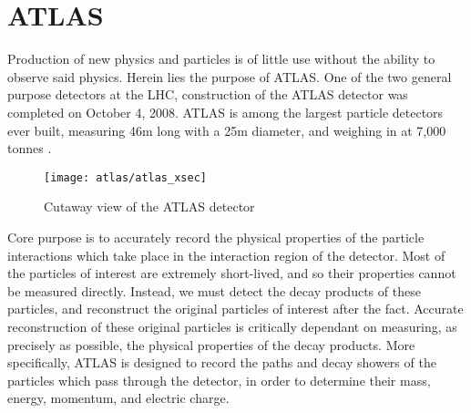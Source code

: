 



\chapter{ATLAS} 
    Production of new physics and particles is of little use without the ability to observe said physics.
    Herein lies the purpose of ATLAS.
    One of the two general purpose detectors at the LHC, construction of the ATLAS detector was completed on October 4, 2008.
    ATLAS is among the largest particle detectors ever built, measuring 46m long with a 25m diameter, and weighing in at 7,000 tonnes \cite{atlas_website}.

    \begin{figure}
        \texttt{[image: atlas/atlas\_xsec]}
        \caption{Cutaway view of the ATLAS detector \cite{Pequenao:1095924}}
        \label{fig:atlas_xsec}
    \end{figure}

    Core purpose is to accurately record the physical properties of the particle interactions which take place in the interaction region of the detector.
    Most of the particles of interest are extremely short-lived, and so their properties cannot be measured directly.
    Instead, we must detect the decay products of these particles, and reconstruct the original particles of interest after the fact.
    Accurate reconstruction of these original particles is critically dependant on measuring, as precisely as possible, the physical properties of the decay products.
    More specifically, ATLAS is designed to record the paths and decay showers of the particles which pass through the detector, in order to determine their mass, energy, momentum, and electric charge.


